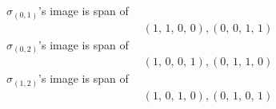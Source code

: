 \documentclass[8pt]{article}\usepackage{amsmath}
\begin{document}
\( \sigma_{(0, 1)}\)'s image is span of   
\begin{align*} \left(1,\,1,\,0,\,0\right) , \left(0,\,0,\,1,\,1\right) \end{align*}
\( \sigma_{(0, 2)}\)'s image is span of   
\begin{align*} \left(1,\,0,\,0,\,1\right) , \left(0,\,1,\,1,\,0\right) \end{align*}
\( \sigma_{(1, 2)}\)'s image is span of   
\begin{align*} \left(1,\,0,\,1,\,0\right) , \left(0,\,1,\,0,\,1\right) \end{align*}
\end{document}
